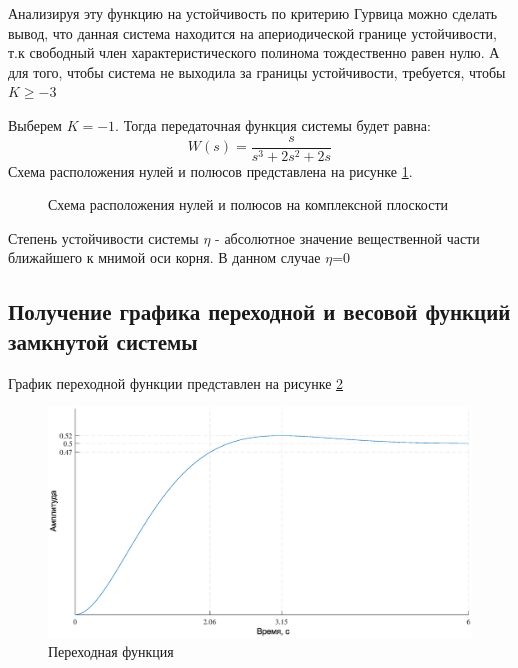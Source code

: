\documentclass[a4paper,12pt]{article}
\begin{document}
	\par 
	Анализируя эту функцию на устойчивость по критерию Гурвица можно сделать вывод, что данная система находится на апериодической границе устойчивости, т.к свободный член характеристического полинома тождественно равен нулю. А для того, чтобы система не выходила за границы устойчивости, требуется, чтобы $K\ge-3$
	\par
	Выберем $K=-1$. Тогда передаточная функция системы будет равна:
	\begin{equation}
	\displaystyle W(s)=\frac{s}{s^3+2s^2+2s}
	\label{eq_3}
	\end{equation}
	Схема расположения нулей и полюсов представлена на рисунке \ref{s_4}.
	\begin{figure} [h!]
		\centering
		\caption{Схема расположения нулей и полюсов на комплексной плоскости}
		\label{s_4}
	\end{figure} 
	
	Степень устойчивости системы $\eta$ - абсолютное значение вещественной части ближайшего к мнимой оси корня. В данном случае $\eta$=0 

	\newpage
	\subsection{Получение графика переходной и весовой функций замкнутой системы}
	График переходной функции представлен на рисунке \ref{s_5} 
	\begin{figure}[h!]
		\begin{center}
			\includegraphics[width=7in]{pereh.eps}
			
		\end{center}
		\caption{Переходная функция}
		\label{s_5}  
	\end{figure}
	
\end{document}

